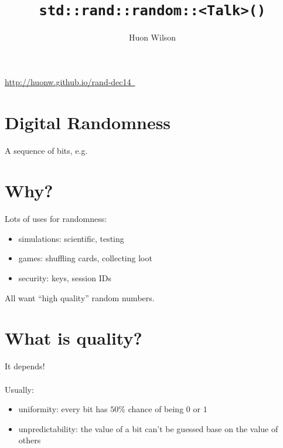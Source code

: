 \documentclass[14pt]{beamer}
\author{Huon Wilson}
\title{\texttt{std::rand::random::<Talk>()}}
\newcommand{\exturl}[1]{\exthref{#1}{#1}}
\newcommand{\exthref}[2]{\href{#1}{#2\ \footnotesize\faExternalLink}}
\begin{document}
\begin{frame}
  \maketitle
  \begin{center}
    \exturl{http://huonw.github.io/rand-dec14}
  \end{center}
\end{frame}

\section{Digital Randomness}
\begin{frame}
A sequence of bits, e.g.


\end{frame}

\section{Why?}
\begin{frame}
  Lots of uses for randomness:
  \begin{itemize}
  \item simulations: scientific, testing
  \item games: shuffling cards, collecting loot
  \item security: keys, session IDs
  \end{itemize}

  All want ``high quality'' random numbers.
\end{frame}

\section{What is quality?}
\begin{frame}
  It depends!\\~\\

  Usually:

  \begin{itemize}
  \item uniformity: every bit has $50\%$ chance of being $0$ or $1$
  \item unpredictability: the value of a bit can't be guessed base
    on the value of others
  \end{itemize}
\end{frame}
\end{document}
